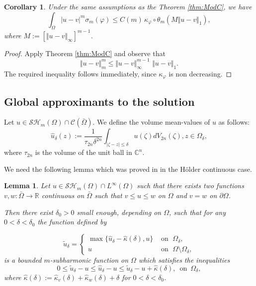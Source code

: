 \documentclass[12pt]{amsart}
\newtheorem{lemma}[theorem]{Lemma}
\newtheorem{corollary}[theorem]{Corollary}
\theoremstyle{definition}
\numberwithin{theorem}{section}
\numberwithin{equation}{section}
\newcommand{\R}{\mathbb{R}}
\newcommand{\C}{\mathbb{C}}
\newcommand{\Om}{\Omega}
\begin{document}
{\begin{corollary} \label{cor:Lmuestimate} Under the same assumptions as the Theorem \ref{thm:ModC}, we have
$$
  \int_\Omega \vert u - v \vert^m \sigma_m (\varphi) \leq  C (m) \,  \kappa_\varphi \circ \theta_m\left(M  \Vert u - v \Vert_1\right),
$$
  where $M := \left[\Vert u - v\Vert_{\infty}\right]^{m - 1}$.
\end{corollary}
\begin{proof} 
Apply Theorem \ref{thm:ModC} 	and observe that 
$$
\Vert u-v\Vert_m^m \leq  \Vert u-v\Vert_{\infty}^{m - 1} \, \,  \Vert u-v\Vert_1.
$$
The required inequality follows immediately, since $\kappa_\varphi $ is non decreasing.
\end{proof}
\subsection{Global approximants to the solution} %

Let $u  \in \mathcal{SH}_m (\Omega) \cap \mathcal C (\bar \Omega)$. We define the volume mean-values of $u$  as follows:
\begin{equation} \label{eq:volumemeanvalue}
\widehat{u}_\delta (z):= \frac{1}{\tau_{2n}\delta^{2n}} \int_{|\zeta -z|\leq \delta} u(\zeta) dV_{2n}(\zeta), z \in \Omega_{\delta},
\end{equation}
where $\tau_{2n}$ is the volume of the unit ball in $\C^n$.

We need  the following lemma which was proved in \cite{Ch16b} in the H\"older continuous case.  

 \begin{lemma}\label{lem:approximation}
 Let  $u \in \mathcal{SH}_m (\Omega) \cap L^{\infty} (\Omega)$ such that there exists two functions $v , w : \bar{\Omega} \longrightarrow \R$  continuous  on $\bar \Omega$ such that $v \leq u \leq w$ on $ \Omega$ and $v = w$ on $\partial \Omega$.

 Then there exist $\delta_0>0$ small enough, depending on $\Omega$,   such that for any $  0<  \delta < \delta_0$ the function defined by 
 
\begin{equation} \label{eq:approximants}
 	\tilde {u}_{\delta}
 		= \begin{cases}
			\max\{\widehat{u}_{\delta} -  \widehat{\kappa} (\delta) , u\} & \text{ on } \; \Omega_\delta,\\
                   u  & \text{ on } \; \Om\setminus \Omega_\delta,
           \end{cases}
\end{equation}
is  a bounded $m$-subharmonic  function  on $\Omega$ which satisfies the inequalities 
$$
 0 \leq  \tilde {u}_{\delta} - u \leq \widehat{u}_{\delta}  - u \leq \tilde{u}_{\delta}  - u +  \widehat{\kappa} (\delta) , \, \, \, \mathrm{on} \, \, \, \Omega_\delta,
$$
where $\widehat{\kappa} (\delta) := \widehat{\kappa}_v (\delta) + \widehat{\kappa}_w (\delta) + \delta$ for $0 < \delta < \delta_0$.


\end{lemma}}
\end{document}
